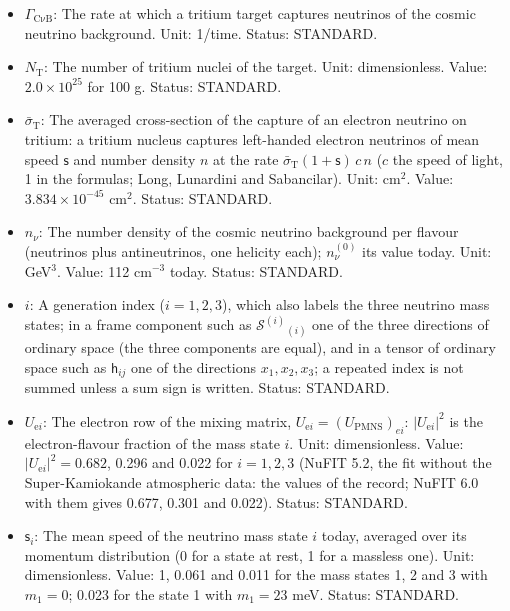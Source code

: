 \documentclass[
  10pt,
]{article}
\providecommand{\tightlist}{%
  \setlength{\itemsep}{0pt}\setlength{\parskip}{0pt}}
\begin{document}
\begin{itemize}
\tightlist
\item
  \(\Gamma_{\mathrm{C\nu B}}\): The rate at which a tritium target
  captures neutrinos of the cosmic neutrino background. Unit: 1/time.
  Status: STANDARD.
\item
  \(N_{\mathrm{T}}\): The number of tritium nuclei of the target. Unit:
  dimensionless. Value: \(2.0\times10^{25}\) for 100 g. Status:
  STANDARD.
\item
  \(\bar\sigma_{\mathrm{T}}\): The averaged cross-section of the capture
  of an electron neutrino on tritium: a tritium nucleus captures
  left-handed electron neutrinos of mean speed \(\mathsf{s}\) and number
  density \(n\) at the rate
  \(\bar\sigma_{\mathrm{T}}(1 + \mathsf{s})\,c\,n\) (\(c\) the speed of
  light, 1 in the formulas; Long, Lunardini and Sabancilar). Unit:
  cm\(^2\). Value: \(3.834\times10^{-45}\) cm\(^2\). Status: STANDARD.
\item
  \(n_\nu\): The number density of the cosmic neutrino background per
  flavour (neutrinos plus antineutrinos, one helicity each);
  \(n_\nu^{(0)}\) its value today. Unit: GeV\(^3\). Value: 112
  cm\(^{-3}\) today. Status: STANDARD.
\item
  \(i\): A generation index (\(i = 1, 2, 3\)), which also labels the
  three neutrino mass states; in a frame component such as
  \(\mathcal{S}^{(i)}{}_{(i)}\) one of the three directions of ordinary
  space (the three components are equal), and in a tensor of ordinary
  space such as \(\mathsf{h}_{ij}\) one of the directions
  \(x_1, x_2, x_3\); a repeated index is not summed unless a sum sign is
  written. Status: STANDARD.
\item
  \(U_{\mathrm{e}i}\): The electron row of the mixing matrix,
  \(U_{\mathrm{e}i} = (U_{\mathrm{PMNS}})_{ei}\):
  \(\lvert U_{\mathrm{e}i}\rvert^2\) is the electron-flavour fraction of
  the mass state \(i\). Unit: dimensionless. Value:
  \(\lvert U_{\mathrm{e}i}\rvert^2 = 0.682\), 0.296 and 0.022 for
  \(i = 1, 2, 3\) (NuFIT 5.2, the fit without the Super-Kamiokande
  atmospheric data: the values of the record; NuFIT 6.0 with them gives
  0.677, 0.301 and 0.022). Status: STANDARD.
\item
  \(\mathsf{s}_i\): The mean speed of the neutrino mass state \(i\)
  today, averaged over its momentum distribution (0 for a state at rest,
  1 for a massless one). Unit: dimensionless. Value: 1, 0.061 and 0.011
  for the mass states 1, 2 and 3 with \(m_1 = 0\); 0.023 for the state 1
  with \(m_1 = 23\) meV. Status: STANDARD.
\end{itemize}
\end{document}
